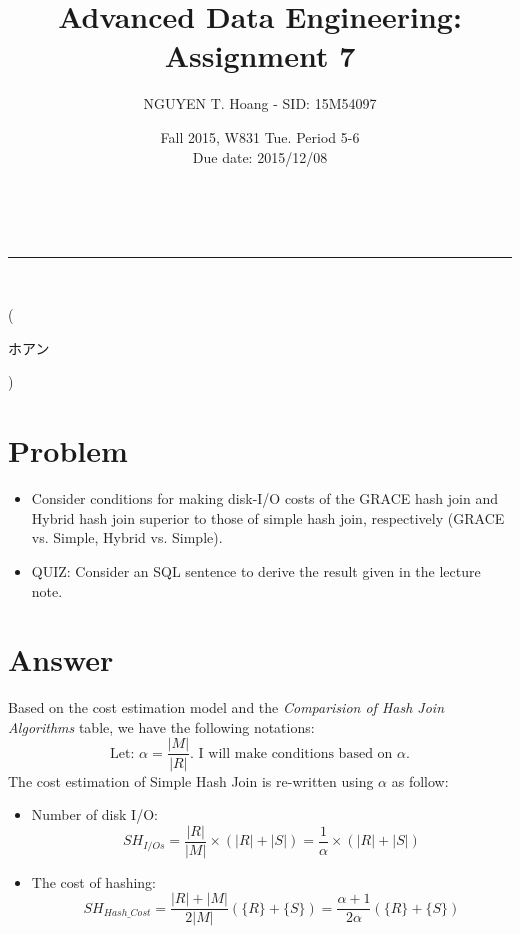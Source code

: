 \documentclass[a4paper,12pt]{article}
\makeatletter
\newcommand{\linia}{\rule{\linewidth}{0.5pt}}
\renewcommand{\maketitle} {
\begin{center}
\vspace{2ex}
{\LARGE \textsc{\@title}}
\vspace{1ex}
\\
\linia\\
\@author \hfill \@date
\vspace{4ex}
\end{center}
}
\makeatother
\begin{document}
\title{Advanced Data Engineering: Assignment 7}

\author{NGUYEN T. Hoang - SID: 15M54097}

\date{Fall 2015, W831 Tue. Period 5-6 \\ \hfill Due date: 2015/12/08}

\maketitle
\vspace{-4.5em}
\hspace{5.3em} (\begin{CJK}{UTF8}{min}ホアン\end{CJK})
\vfill
\section*{Problem}
\begin{itemize}
	\item Consider conditions for making disk-I/O costs of the GRACE hash join and Hybrid hash join superior to those of simple hash join, respectively (GRACE vs. Simple, Hybrid vs. Simple).	
	\item QUIZ: Consider an SQL sentence to derive the result given in the lecture note.
\end{itemize}


\vspace{3em}
\section*{Answer}
\noindent
Based on the cost estimation model and the \emph{Comparision of Hash Join Algorithms} table, we have the following notations:
\begin{equation}
	\mbox{Let: } \alpha = \frac{|M|}{|R|} \mbox{. I will make conditions based on } \alpha.
\end{equation}
The cost estimation of Simple Hash Join is re-written using $\alpha$ as follow:
\begin{itemize}
	\item Number of disk I/O: $$SH_{I/Os} = \frac{|R|}{|M|} \times (|R| + |S|) = \frac{1}{\alpha} \times (|R| + |S|)$$
	\item The cost of hashing:  $$SH_{Hash\_Cost} = \frac{|R| + |M|}{2|M|}(\{R\} + \{S\}) = \frac{\alpha + 1}{2\alpha} (\{R\} + \{S\}) $$
\end{itemize}
\vfill
\pagebreak
\end{document}
